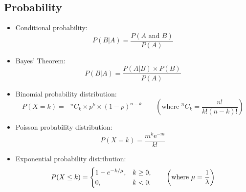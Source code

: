\documentclass[a4paper,12pt]{article}
\begin{document}
\subsection*{Probability}
\begin{itemize}

\item Conditional probability:
\begin{equation*}
P(B|A)=\frac{P\left( A\text{ and }B\right) }{P\left( A\right) }
\end{equation*}


\item Bayes' Theorem:
\begin{equation*}
P(B|A)=\frac{P\left(A|B\right) \times P(B) }{P\left( A\right) }
\end{equation*}





\item Binomial probability distribution:
\begin{equation*}
P(X = k) = \text{  }^{n}C_{k} \times p^{k} \times \left( 1-p\right) ^{n-k}\qquad \left( \text{where  }
^{n}C_{k} =\frac{n!}{k!\left(n-k\right) !} \right)
\end{equation*}

\item Poisson probability distribution:
\begin{equation*}
P(X = k) =\frac{m^{k}\mathrm{e}^{-m}}{k!}
\end{equation*}

\item Exponential probability distribution:
\begin{equation*}
P(X \leq k) = \begin{cases}
1-e^{- k/\mu}, & k \ge 0, \\
0, & k < 0.
\end{cases}\qquad \left( \text{where  }
\mu = {1\over \lambda}\right)
\end{equation*}
\end{itemize}
\end{document}
